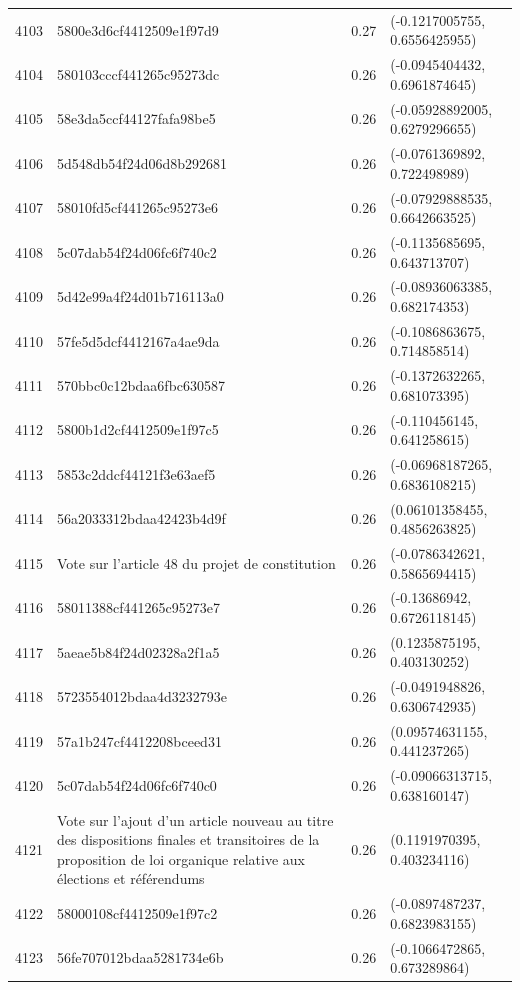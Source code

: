 \begin{table}[ht]
\begin{tabular}{rlrl}
  4103 & 5800e3d6cf4412509e1f97d9 & 0.27 & (-0.1217005755, 0.6556425955) \\ 
  4104 & 580103cccf441265c95273dc & 0.26 & (-0.0945404432, 0.6961874645) \\ 
  4105 & 58e3da5ccf44127fafa98be5 & 0.26 & (-0.05928892005, 0.6279296655) \\ 
  4106 & 5d548db54f24d06d8b292681 & 0.26 & (-0.0761369892, 0.722498989) \\ 
  4107 & 58010fd5cf441265c95273e6 & 0.26 & (-0.07929888535, 0.6642663525) \\ 
  4108 & 5c07dab54f24d06fc6f740c2 & 0.26 & (-0.1135685695, 0.643713707) \\ 
  4109 & 5d42e99a4f24d01b716113a0 & 0.26 & (-0.08936063385, 0.682174353) \\ 
  4110 & 57fe5d5dcf4412167a4ae9da & 0.26 & (-0.1086863675, 0.714858514) \\ 
  4111 & 570bbc0c12bdaa6fbc630587 & 0.26 & (-0.1372632265, 0.681073395) \\ 
  4112 & 5800b1d2cf4412509e1f97c5 & 0.26 & (-0.110456145, 0.641258615) \\ 
  4113 & 5853c2ddcf44121f3e63aef5 & 0.26 & (-0.06968187265, 0.6836108215) \\ 
  4114 & 56a2033312bdaa42423b4d9f & 0.26 & (0.06101358455, 0.4856263825) \\ 
  4115 & Vote sur l'article 48 du projet de constitution & 0.26 & (-0.0786342621, 0.5865694415) \\ 
  4116 & 58011388cf441265c95273e7 & 0.26 & (-0.13686942, 0.6726118145) \\ 
  4117 & 5aeae5b84f24d02328a2f1a5 & 0.26 & (0.1235875195, 0.403130252) \\ 
  4118 & 5723554012bdaa4d3232793e & 0.26 & (-0.0491948826, 0.6306742935) \\ 
  4119 & 57a1b247cf4412208bceed31 & 0.26 & (0.09574631155, 0.441237265) \\ 
  4120 & 5c07dab54f24d06fc6f740c0 & 0.26 & (-0.09066313715, 0.638160147) \\ 
  4121 & Vote sur l'ajout d'un article nouveau au titre des dispositions finales et transitoires de la proposition de loi organique relative aux élections et référendums & 0.26 & (0.1191970395, 0.403234116) \\ 
  4122 & 58000108cf4412509e1f97c2 & 0.26 & (-0.0897487237, 0.6823983155) \\ 
  4123 & 56fe707012bdaa5281734e6b & 0.26 & (-0.1066472865, 0.673289864) \\ 

\end{tabular}
\end{table}

